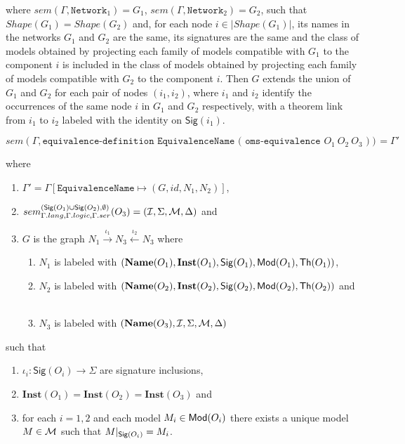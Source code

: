 \documentclass[10pt,fleqn,final]{scrreprt}
\newcommand{\cbs}[0]{\color{red}\xspace} %
\newcommand{\cbe}[0]{\color{black}\xspace} %
\newcommand*{\syntax}[1]{\texttt{#1}}
\newcommand{\Sig}{\mathsf{Sig}}
\renewcommand{\Th}{\mathsf{Th}}
\newcommand{\Inst}{\ensuremath{\mathbf{Inst}}}
\newcommand{\Name}{\ensuremath{\mathbf{Name}}}
\newcommand{\semdom}[1]{
\begin{center}
\fbox{$#1$}
\end{center}
}
\newenvironment{definitions}[0]{\medskip }{}
\begin{document}
\begin{definitions}
\noindent where $sem(\Gamma, \syntax{Network}_1) = G_1$,
$sem(\Gamma, \syntax{Network}_2) = G_2$, 
such that $Shape(G_1) = Shape(G_2)$ and, for each node $i\in |Shape(G_1)|$,
its names in the networks $G_1$ and $G_2$ are the same,
its signatures are the same
and the class of models obtained by projecting each family of models
compatible with $G_1$ to the component $i$
is included in the
class of models obtained by projecting each family of models
compatible with $G_2$ to the component $i$.
Then $G$ extends the union of $G_1$ and $G_2$ for each 
pair of nodes $(i_1, i_2)$,
where $i_1$ and $i_2$ identify the occurrences of the same node $i$
in $G_1$ and $G_2$ respectively,
with a theorem link 
from $i_1$ to $i_2$ labeled with the identity
on $\Sig(i_1)$. 



\semdom{sem(\Gamma,\syntax{EquivalenceDefinition})=\Gamma'}

$$sem(\Gamma,\syntax{equivalence-definition  EquivalenceName  ( oms-equivalence }O_1\ O_2\ O_3\syntax{ )})=\Gamma'$$

\cbs
\noindent where 
\begin{enumerate}
\item $\Gamma' = \Gamma[\syntax{EquivalenceName} \mapsto (G, id, N_1, N_2)]$,
\item
$sem^{(\Sig(O_1)\cup\Sig(O_2),\emptyset)}_{\Gamma.lang,\Gamma.logic,\Gamma.ser}(O_3)
= (\cI, \Sigma, \cM,\Delta)$
and 
\item
$G$ is the graph
$N_1 \stackrel{\iota_1}{\rightarrow} N_3 \stackrel{\iota_2}{\leftarrow} 
N_3$ where
\begin{enumerate}
\item
$N_1$ is labeled with $(\Name(O_1), \Inst(O_1), \Sig(O_1),\Mod(O_1), \Th(O_1))$,
\item
$N_2$ is labeled with $(\Name(O_2), \Inst(O_2),\Sig(O_2), \Mod(O_2), \Th(O_2))$
and \
\item
$N_3$ is labeled with 
$(\Name(O_3), \cI, \Sigma, \cM, \Delta)$
\end{enumerate}
\end{enumerate}
such that
\begin{enumerate}
\item $\iota_i : \Sig(O_i) \to \Sigma$ are signature inclusions,
\item 
$\Inst(O_1) = \Inst(O_2) = \Inst(O_3)$ and 
\item
for each $i = 1,2$ and each model $M_i \in \mathsf{Mod}(O_i)$ there exists a unique model $M\in {\cal M}$
such that $M\forget{\Sig(O_i)} = M_i$. 
\end{enumerate}
\cbe


\end{definitions}
\end{document}
